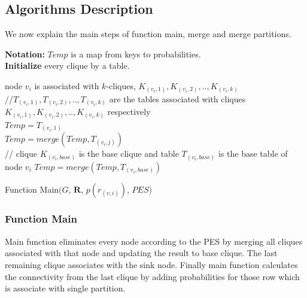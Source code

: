\documentclass[12pt]{article}
\begin{document}
\subsection{Algorithms Description}
\label{sub:Ald}
We now explain the main steps of function main, merge and merge partitions.
\begin{algorithm} [h]
\Indm
{}
\textbf {Notation:} $Temp$ is a map from keys to probabilities.\\
\Indp
\nl \textbf{Initialize } every clique by  a table.\\
\nl{}
{
 \nl node $v_i$ is associated with $k$-cliques, $K_{(v_i,1)},K_{(v_i,2)},..,K_{(v_i,k)}$ \\
 //$T_{(v_i,1)},T_{(v_i,2)},..,T_{(v_i,k)}$ are the tables associated with cliques $K_{(v_i,1)},K_{(v_i,2)},..,K_{(v_i,k)}$ respectively \\
\nl $ Temp=T_{(v_i,1)}$  \\
 \nl {}
 {
  \nl $Temp=merge(Temp,T_{(v_i,j)})$\\
 }
 // clique $K_{(v_i,base)}$ is the base clique and table $T_{(v_i,base)}$ is the base table of node $v_i$
  \nl $Temp=merge(Temp,T_{(v_i,base)})$\\
\nl  {}

\nl {}
}

\nl {}
\caption{Function Main$(G$, $\textbf{R}$, $p(r_{(v,i)})$, $PES )$}
\end{algorithm}

\subsubsection{Function Main}
\label{subsub:Main}
Main function eliminates every node according to the PES by merging all cliques associated with that node and updating the result to base clique. The last remaining clique associates with the sink node. Finally  main function calculates the connectivity from the last clique by adding probabilities for those row which is associate with single partition.
\end{document}
